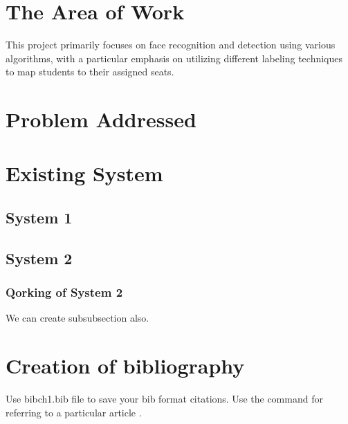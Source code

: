 \section{The Area of Work}This project primarily focuses on face recognition and detection using various algorithms, with a particular emphasis on utilizing different labeling techniques to map students to their assigned seats.


\section{Problem Addressed}
\blindtext

\section{Existing System}
\blindtext

\subsection{ System 1}
\blindtext

 \subsection{System 2}
 \subsubsection{Qorking of System 2}
 We can create subsubsection also. 
\section{Creation of bibliography}
Use bibch1.bib file to save your bib format citations. Use the command \cite{saini2010alternative} for referring to a particular article \cite{imre2006majority}. 





